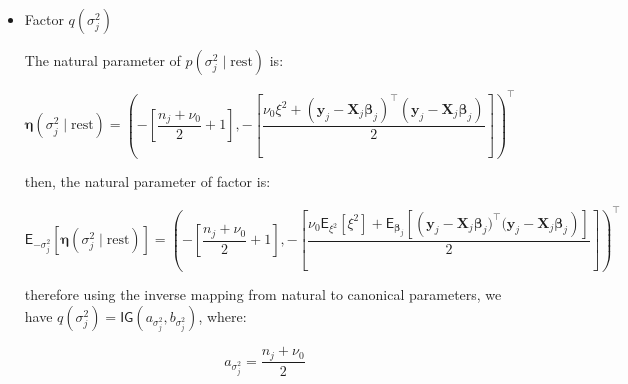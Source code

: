 \begin{appendix}
\begin{itemize}
\begin{equation}
\mathsf{E}_{-\bm{\Sigma}}\left[\bm{\eta}(\bm{\Sigma}\mid \text{rest})\right]=\left(-\frac{1}{2}\left[ \bm{S}_0 + \sum_{j=1}^{m} \mathsf{E}_{\bm{\beta}_j,\bm{\beta}}\left[\left(\bm{\beta}_j - \bm{\beta})(\bm{\beta}_j - \bm{\beta}\right)^\top\right]\right],-\left[\frac{n_0 + m + p + 1}{2}\right]\right)^\top
\end{equation}

therefore using the inverse mapping from natural to canonical parameters, we have $q(\bm{\Sigma})=\mathsf{IW}(\nu_{\bm{\Sigma}},\bm{S}_{\bm{\Sigma}})$, where:

\begin{equation}
\nu_{\bm{\Sigma}} = n_0+m
\end{equation}

and

\begin{equation}
\bm{S}_{\bm{\Sigma}}= \left[ \bm{S}_0 + \sum_{j=1}^{m} \mathsf{E}_{\bm{\beta}_j,\bm{\beta}}\left[\left(\bm{\beta}_j - \bm{\beta})(\bm{\beta}_j - \bm{\beta}\right)^\top\right]\right]
\end{equation}

\item Factor $q(\sigma_j^2)$

The natural parameter of $p(\sigma_j^2\mid \text{rest}) $ is:

\begin{equation}
\bm{\eta}(\sigma_j^2\mid \text{rest})=\left(-\left[\frac{n_j + \nu_0}{2}+1\right],-\left[ \frac{ \nu_0 \xi^2 +  (\bm{y}_{j} - \bm{X}_{j} \bm{\beta}_j)^\top(\bm{y}_{j} - \bm{X}_{j} \bm{\beta}_j)}{2}\right]\right)^\top
\end{equation}

then, the natural parameter of factor is:

\begin{equation}
\mathsf{E}_{-\sigma_j^2}\left[\bm{\eta}(\sigma_j^2 \mid \text{rest})\right]=\left(-\left[\frac{n_j + \nu_0}{2}+1\right],-\left[ \frac{ \nu_0 \mathsf{E}_{\xi^2}\left[\xi^2\right] +  \mathsf{E}_{\bm{\beta}_j}\left[\left(\bm{y}_{j} - \bm{X}_{j} \bm{\beta}_j)^\top(\bm{y}_{j} - \bm{X}_{j} \bm{\beta}_j\right)\right]}{2}\right]\right)^\top
\end{equation}

therefore using the inverse mapping from natural to canonical parameters, we have $q(\sigma_j^2)=\mathsf{IG}(a_{\sigma_j^2},b_{\sigma_j^2})$, where:

\begin{equation}
a_{\sigma_j^2}= \frac{n_j + \nu_0}{2}
\end{equation}


\end{itemize}
\end{appendix}
